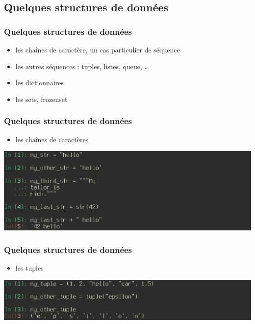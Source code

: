 
\subsection{Quelques structures de données}
\begin{frame}
  \frametitle{Quelques structures de données}
  \begin{itemize}
      \item<1-> les chaînes de caractère, un cas particulier de séquence
      \item<2-> les autres séquences : tuples, listes, queue, \ldots
      \item<3-> les dictionnaires
      \item<4-> les sets, frozenset
    \end{itemize}
\end{frame}

\begin{frame}
  \frametitle{Quelques structures de données}
    \begin{itemize}
      \item les chaînes de caractères
    \end{itemize}
    \includegraphics[scale=0.35]{type_str.png}
\end{frame}

\begin{frame}
  \frametitle{Quelques structures de données}
    \begin{itemize}
      \item les tuples
    \end{itemize}
    \includegraphics[scale=0.35]{type_tuple.png}
\end{frame}

